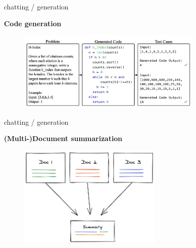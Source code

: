 \begin{vbframe}{chatting / generation}

\vfill
	
\textbf{Code generation}

\begin{figure}
	\centering
		\includegraphics[width = 9cm]{figure/code-generation.png}\\ 
\end{figure}

\vfill

\end{vbframe}


\begin{vbframe}{chatting / generation}

\vfill
	
\textbf{(Multi-)Document summarization}

\begin{figure}
	\centering
		\includegraphics[width = 7cm]{figure/mds-diagram.png}\\ 
\end{figure}

\vfill

\end{vbframe}


